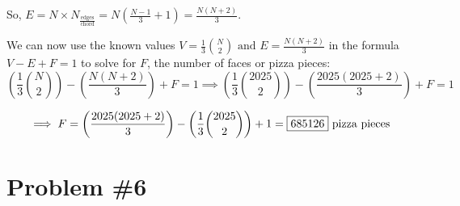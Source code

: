 \documentclass[10pt]{article}
\theoremstyle{plain}
\theoremstyle{definition}
\theoremstyle{remark}
\begin{document}
So, \(E=N\times N_{\frac{\text{edges}}{\text{chord}}}=N(\frac{N-1}{3}+1)=\frac{N(N+2)}{3}.\)

We can now use the known values \(V=\frac{1}{3}\binom{N}{2}\text{ and }E=\frac{N(N+2)}{3}\) in the formula \(V-E+F=1\) to solve for \(F\), the number of faces or pizza pieces: \[\left(\frac{1}{3}\binom{N}{2}\right)-\left(\frac{N(N+2)}{3}\right)+F=1\implies \left(\frac{1}{3}\binom{2025}{2}\right)-\left(\frac{2025(2025+2)}{3}\right)+F=1\]

\[\implies F = \left(\frac{2025(2025+2)}{3}\right) - \left(\frac{1}{3}\binom{2025}{2}\right) + 1 = \fbox{685126} \text{ pizza pieces}\]

\section{Problem \#6}
\end{document}

